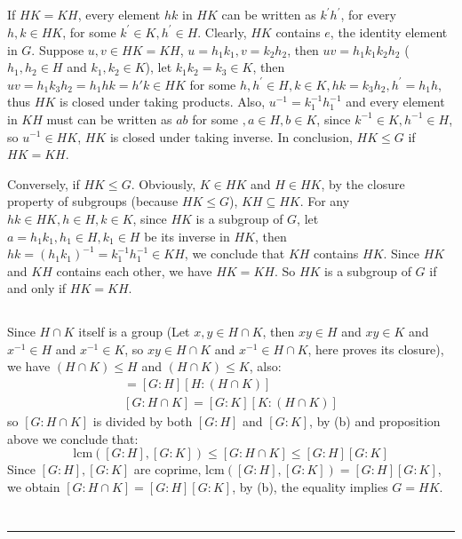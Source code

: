 \documentclass[12pt]{article}
\begin{document}
\subsection{}

If $HK=KH$, every element $hk$ in $HK$ can be written as $k^{'}h^{'}$, for every $h,k\in HK$, for some $k^{'}\in K,h^{'}\in H$. Clearly, $HK$ contains $e$, the identity element in $G$. Suppose $u,v\in HK=KH$, $u=h_1k_1, v=k_2h_2$, then $uv=h_1k_1k_2h_2$ ($h_1,h_2\in H$ and $k_1,k_2\in K$), let $k_1k_2=k_3\in K$, then $uv=h_1k_3h_2=h_1hk=h'k\in HK$ for some $h,h^{'}\in H, k\in K,hk=k_3h_2, h^{'}=h_1h$, thus $HK$ is closed under taking products. Also, $u^{-1}=k_1^{-1}h_1^{-1}$ and every element in $KH$ must can be written as $ab$ for some $,a\in H,b\in K$, since $k^{-1}\in K,h^{-1}\in H$, so $u^{-1}\in HK$, $HK$ is closed under taking inverse. In conclusion, $HK\le G$ if $HK=KH$.

Conversely, if $HK\le G$. Obviously, $K\in HK$ and $H\in HK$, by the closure property of subgroups (because $HK\le G$), $KH\subseteq HK$. For any $hk\in HK, h\in H, k\in K$, since $HK$ is a subgroup of $G$, let $a=h_1k_1, h_1\in H, k_1\in H$ be its inverse in $HK$, then $hk=(h_1k_1)^{-1}=k_1^{-1}h_1^{-1}\in KH$, we conclude that $KH$ contains $HK$. Since $HK$ and $KH$ contains each other, we have $HK=KH$. So $HK$ is a subgroup of $G$ if and only if $HK=KH$.
\subsection{}
Since $H\cap K$ itself is a group (Let $x,y\in H\cap K$, then $xy\in H$ and $xy\in K$ and $x^{-1}\in H$ and $x^{-1}\in K$, so $xy\in H\cap K$ and $x^{-1}\in H\cap K$, here proves its closure), we have $(H\cap K)\le H$ and $(H\cap K)\le K$, also:
\begin{align*}
    [G:H\cap K]=[G:H][H:(H\cap K)] \\
    [G:H\cap K]=[G:K][K:(H\cap K)]
\end{align*}
so $[G:H\cap K]$ is divided by both $[G:H]$ and $[G:K]$, by (b) and proposition above we conclude that:
$$\mathrm{lcm}([G:H],[G:K])\le [G:H\cap K]\le [G:H][G:K]$$
Since $[G:H],[G:K]$ are coprime, $\mathrm{lcm}([G:H],[G:K])=[G:H][G:K]$, we obtain $[G:H\cap K]=[G:H][G:K]$, by (b), the equality implies $G=HK$.

\section{}
\noindent\rule{\textwidth}{1pt}
\end{document}
